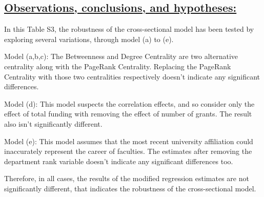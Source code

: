 \documentclass{article}\usepackage[]{graphicx}\usepackage[]{color}
\begin{document}
\subsection*{\underline{Observations, conclusions, and hypotheses:}}
\begin{description}
  \item In this Table S3, the robustness of the cross-sectional model has been tested by exploring several variations, through model (a) to (e). 
  \item[$\bullet$]  Model (a,b,c): The Betweenness and Degree Centrality are two alternative centrality along with the PageRank Centrality. Replacing the PageRank Centrality with those two centralities respectively doesn't indicate any significant differences.
  \item[$\bullet$]  Model (d): This model suspects the correlation effects, and so consider only the effect of total funding with removing the effect of number of grants. The result also isn't significantly different.
    \item[$\bullet$]  Model (e): This model assumes that the most recent university affiliation could inaccurately represent the career of faculties. The estimates after removing the department rank variable doesn't indicate any significant differences too.
  \item Therefore, in all cases, the results of the modified regression estimates are not significantly different, that indicates the robustness of the cross-sectional model.
\end{description}
\end{document}
